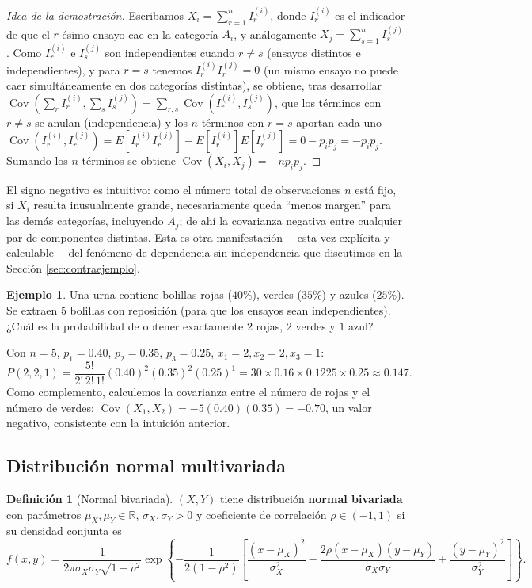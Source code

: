 \documentclass[11pt,a4paper]{article}
\theoremstyle{plain}
\theoremstyle{definition}
\newtheorem{definicion}[teorema]{Definición}
\newtheorem{ejemplo}[teorema]{Ejemplo}
\theoremstyle{remark}
\begin{document}
\begin{proof}[Idea de la demostración]
Escribamos $X_i = \sum_{r=1}^n I_r^{(i)}$, donde $I_r^{(i)}$ es el indicador de que el $r$-ésimo ensayo cae en la categoría $A_i$, y análogamente $X_j=\sum_{s=1}^n I_s^{(j)}$. Como $I_r^{(i)}$ e $I_s^{(j)}$ son independientes cuando $r\ne s$ (ensayos distintos e independientes), y para $r=s$ tenemos $I_r^{(i)}I_r^{(j)}=0$ (un mismo ensayo no puede caer simultáneamente en dos categorías distintas), se obtiene, tras desarrollar $\operatorname{Cov}\!\left(\sum_r I_r^{(i)},\sum_s I_s^{(j)}\right)=\sum_{r,s}\operatorname{Cov}(I_r^{(i)},I_s^{(j)})$, que los términos con $r\ne s$ se anulan (independencia) y los $n$ términos con $r=s$ aportan cada uno $\operatorname{Cov}(I_r^{(i)},I_r^{(j)}) = E[I_r^{(i)}I_r^{(j)}]-E[I_r^{(i)}]E[I_r^{(j)}] = 0-p_ip_j=-p_ip_j$. Sumando los $n$ términos se obtiene $\operatorname{Cov}(X_i,X_j)=-np_ip_j$.
\end{proof}

El signo negativo es intuitivo: como el número total de observaciones $n$ está fijo, si $X_i$ resulta inusualmente grande, necesariamente queda ``menos margen'' para las demás categorías, incluyendo $A_j$; de ahí la covarianza negativa entre cualquier par de componentes distintas. Esta es otra manifestación —esta vez explícita y calculable— del fenómeno de dependencia sin independencia que discutimos en la Sección \ref{sec:contraejemplo}.

\begin{ejemplo}
Una urna contiene bolillas rojas ($40\%$), verdes ($35\%$) y azules ($25\%$). Se extraen $5$ bolillas con reposición (para que los ensayos sean independientes). ¿Cuál es la probabilidad de obtener exactamente $2$ rojas, $2$ verdes y $1$ azul?

Con $n=5$, $p_1=0.40$, $p_2=0.35$, $p_3=0.25$, $x_1=2,x_2=2,x_3=1$:
\[
P(2,2,1) = \frac{5!}{2!\,2!\,1!}(0.40)^2(0.35)^2(0.25)^1 = 30\times0.16\times0.1225\times0.25 \approx 0.147.
\]
Como complemento, calculemos la covarianza entre el número de rojas y el número de verdes: $\operatorname{Cov}(X_1,X_2) = -5(0.40)(0.35) = -0.70$, un valor negativo, consistente con la intuición anterior.
\end{ejemplo}

\subsection{Distribución normal multivariada}

\begin{definicion}[Normal bivariada]
$(X,Y)$ tiene distribución \textbf{normal bivariada} con parámetros $\mu_X,\mu_Y\in\mathbb R$, $\sigma_X,\sigma_Y>0$ y coeficiente de correlación $\rho\in(-1,1)$ si su densidad conjunta es
\[
f(x,y) = \frac{1}{2\pi\sigma_X\sigma_Y\sqrt{1-\rho^2}} \exp\left\{-\frac{1}{2(1-\rho^2)}\left[\frac{(x-\mu_X)^2}{\sigma_X^2} - \frac{2\rho(x-\mu_X)(y-\mu_Y)}{\sigma_X\sigma_Y} + \frac{(y-\mu_Y)^2}{\sigma_Y^2}\right]\right\}.
\]
\end{definicion}
\end{document}
